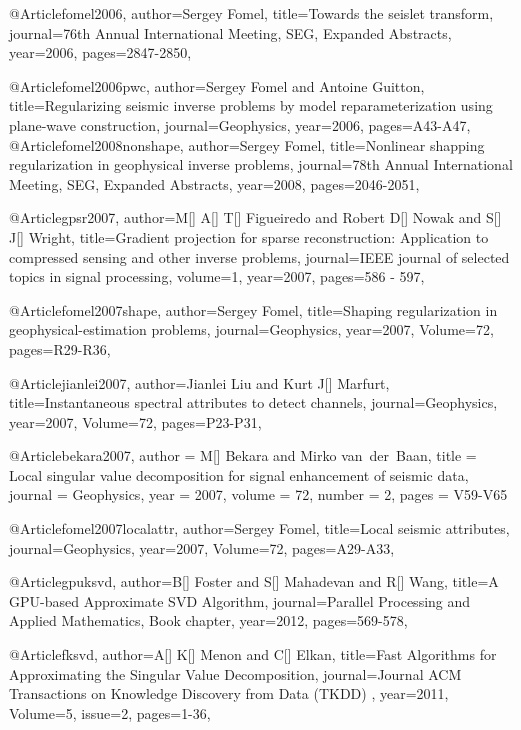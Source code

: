@Article{fomel2006,
  author={Sergey Fomel},
  title={Towards the seislet transform},
  journal={76th Annual International Meeting, SEG, Expanded Abstracts},
  year=2006,
  pages={2847-2850},
}

@Article{fomel2006pwc,
  author={Sergey Fomel and Antoine Guitton},
  title={Regularizing seismic inverse problems by model reparameterization using plane-wave construction},
  journal={Geophysics},
  year=2006,
  pages={A43-A47},
}
@Article{fomel2008nonshape,
  author={Sergey Fomel},
  title={Nonlinear shapping regularization in geophysical inverse problems},
  journal={78th Annual International Meeting, SEG, Expanded Abstracts},
  year=2008,
  pages={2046-2051},
}

@Article{gpsr2007,
author={M[] A[] T[] Figueiredo and Robert D[] Nowak and S[] J[] Wright},
title={Gradient projection for sparse reconstruction: Application to compressed sensing and other inverse problems},
journal={IEEE journal of selected topics in signal processing},
volume=1,
year=2007,
pages={586 - 597},
}

@Article{fomel2007shape,
  author={Sergey Fomel},
  title={Shaping regularization in geophysical-estimation problems},
  journal={Geophysics},
  year=2007,
  Volume=72,
  pages={R29-R36},
}

@Article{jianlei2007,
  author={Jianlei Liu and Kurt J[] Marfurt},
  title={Instantaneous spectral attributes to detect channels},
  journal={Geophysics},
  year=2007,
  Volume=72,
  pages={P23-P31},
}




@Article{bekara2007,
  author = 	 {M[] Bekara and Mirko van~der~Baan},
  title = 	 {Local singular value decomposition for signal enhancement of seismic data},
  journal = 	 {Geophysics},
  year = 	 2007,
  volume = 	 72,
  number = 	 2,
  pages = 	 {V59-V65}}

@Article{fomel2007localattr,
  author={Sergey Fomel},
  title={Local seismic attributes},
  journal={Geophysics},
  year=2007,
  Volume=72,
  pages={A29-A33},
}

@Article{gpuksvd,
  author={B[] Foster and S[] Mahadevan and R[] Wang},
  title={A {GPU}-based Approximate {SVD} Algorithm},
  journal={Parallel Processing and Applied Mathematics, Book chapter},
  year=2012,
  pages={569-578},
}

@Article{fksvd,
  author={A[] K[] Menon and C[] Elkan},
  title={Fast Algorithms for Approximating the Singular Value Decomposition},
  journal={Journal ACM Transactions on Knowledge Discovery from Data (TKDD) },
  year=2011,
  Volume=5,
  issue=2,
  pages={1-36},
}






